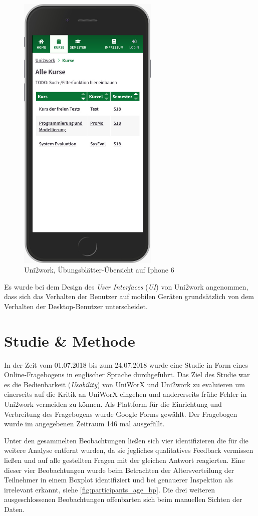 \documentclass[11pt,a4paper,twoside,ngerman]{article}
\begin{document}
\begin{figure}
    \centering
    \includegraphics[width=67mm]{m_uni2work_courses_green.jpg}
    \caption{Uni2work, Übungsblätter-Übersicht auf Iphone 6}
    \label{fig:uniworx_mobile}
\end{figure}

Es wurde bei dem Design des \emph{User Interfaces} (\emph{UI}) von Uni2work angenommen, dass sich das Verhalten der Benutzer auf mobilen Geräten grundsätzlich von dem Verhalten der Desktop-Benutzer unterscheidet. 

\clearpage
\section{Studie \& Methode} \label{sec:userstudies}
In der Zeit vom 01.07.2018 bis zum 24.07.2018 wurde eine Studie in Form eines Online-Fragebogens in englischer Sprache durchgeführt.
Das Ziel des Studie war es die Bedienbarkeit (\emph{Usability}) von UniWorX und Uni2work zu evaluieren um einerseits auf die Kritik an UniWorX eingehen und andererseits frühe Fehler in Uni2work vermeiden zu können. Als Plattform für die Einrichtung und Verbreitung des Fragebogens wurde Google Forms gewählt. Der Fragebogen wurde im angegebenen Zeitraum 146 mal ausgefüllt.

Unter den gesammelten Beobachtungen ließen sich vier identifizieren die für die weitere Analyse entfernt wurden, da sie jegliches qualitatives Feedback vermissen ließen und auf alle gestellten Fragen mit der gleichen Antwort reagierten. Eine dieser vier Beobachtungen wurde beim Betrachten der Altersverteilung der Teilnehmer in einem Boxplot identifiziert und bei genauerer Inspektion als irrelevant erkannt, siehe \autoref{fig:participants_age_bp}. Die drei weiteren ausgeschlossenen Beobachtungen offenbarten sich beim manuellen Sichten der Daten.
\end{document}
